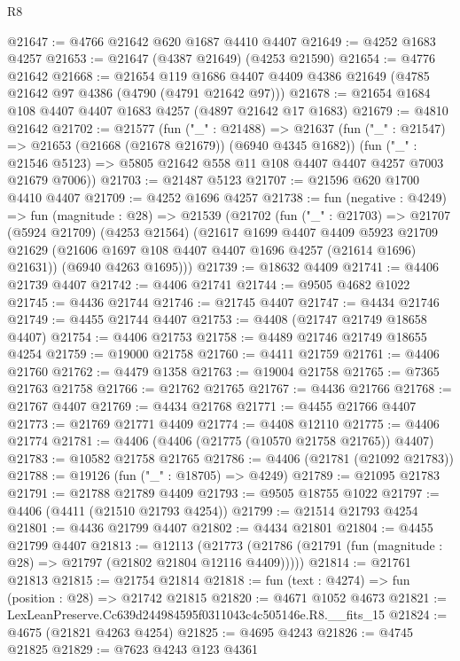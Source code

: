 \begin{lexlean}{R8}
\begin{coremodule}
@21647 := @4766 @21642 @620 @1687 @4410 @4407
@21649 := @4252 @1683 @4257
@21653 := @21647 (@4387 @21649) (@4253 @21590)
@21654 := @4776 @21642
@21668 := @21654
    @119
    @1686
    @4407
    @4409
    @4386
    @21649
    (@4785 @21642 @97 @4386 (@4790 (@4791 @21642 @97)))
@21678 := @21654 @1684 @108 @4407 @4407 @1683 @4257 (@4897 @21642 @17 @1683)
@21679 := @4810 @21642
@21702 := @21577
    (fun ("_" : @21488) =>
    @21637
      (fun ("_" : @21547) => @21653 (@21668 (@21678 @21679)) (@6940 @4345 @1682))
      (fun ("_" : @21546 @5123) => @5805 @21642 @558 @11 @108 @4407 @4407 @4257 @7003 @21679 @7006))
@21703 := @21487 @5123
@21707 := @21596 @620 @1700 @4410 @4407
@21709 := @4252 @1696 @4257
@21738 := fun (negative : @4249) =>
  fun (magnitude : @28) =>
  @21539
    (@21702
      (fun ("_" : @21703) =>
      @21707
        (@5924 @21709)
        (@4253 @21564)
        (@21617
          @1699
          @4407
          @4409
          @5923
          @21709
          @21629
          (@21606 @1697 @108 @4407 @4407 @1696 @4257 (@21614 @1696) @21631))
        (@6940 @4263 @1695)))
@21739 := @18632 @4409
@21741 := @4406 @21739 @4407
@21742 := @4406 @21741
@21744 := @9505 @4682 @1022
@21745 := @4436 @21744
@21746 := @21745 @4407
@21747 := @4434 @21746
@21749 := @4455 @21744 @4407
@21753 := @4408 (@21747 @21749 @18658 @4407)
@21754 := @4406 @21753
@21758 := @4489 @21746 @21749 @18655 @4254
@21759 := @19000 @21758
@21760 := @4411 @21759
@21761 := @4406 @21760
@21762 := @4479 @1358
@21763 := @19004 @21758
@21765 := @7365 @21763 @21758
@21766 := @21762 @21765
@21767 := @4436 @21766
@21768 := @21767 @4407
@21769 := @4434 @21768
@21771 := @4455 @21766 @4407
@21773 := @21769 @21771 @4409
@21774 := @4408 @12110
@21775 := @4406 @21774
@21781 := @4406 (@4406 (@21775 (@10570 @21758 @21765)) @4407)
@21783 := @10582 @21758 @21765
@21786 := @4406 (@21781 (@21092 @21783))
@21788 := @19126 (fun ("_" : @18705) => @4249)
@21789 := @21095 @21783
@21791 := @21788 @21789 @4409
@21793 := @9505 @18755 @1022
@21797 := @4406 (@4411 (@21510 @21793 @4254))
@21799 := @21514 @21793 @4254
@21801 := @4436 @21799 @4407
@21802 := @4434 @21801
@21804 := @4455 @21799 @4407
@21813 := @12113
    (@21773 (@21786 (@21791 (fun (magnitude : @28) => @21797 (@21802 @21804 @12116 @4409)))))
@21814 := @21761 @21813
@21815 := @21754 @21814
@21818 := fun (text : @4274) => fun (position : @28) => @21742 @21815
@21820 := @4671 @1052 @4673
@21821 := LexLeanPreserve.Cc639d244984595f0311043c4c505146e.R8.__fits_15
@21824 := @4675 (@21821 @4263 @4254)
@21825 := @4695 @4243
@21826 := @4745 @21825
@21829 := @7623 @4243 @123 @4361

\end{coremodule}
\end{lexlean}
